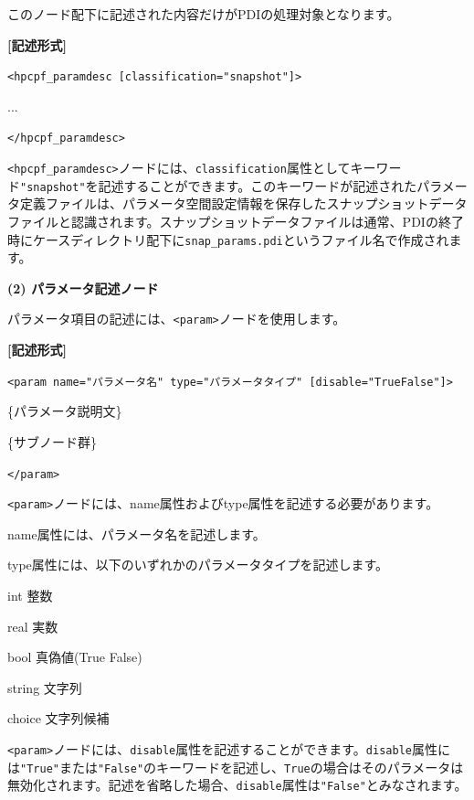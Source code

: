 \documentclass[a4paper,11pt]{jarticle}
\begin{document}
{このノード配下に記述された内容だけがPDIの処理対象となります。

\vspace{8pt}
\leftskip=12pt
\textbf{[記述形式]}

\leftskip=42pt
\texttt{<hpcpf\_paramdesc  [classification="snapshot"]>} 
   
...

\texttt{</hpcpf\_paramdesc>}

\vspace{8pt}
\leftskip=0pt
\texttt{<hpcpf\_paramdesc>}ノードには、{\tt classification}属性としてキーワード\texttt{"snapshot"}を記述することができます。このキーワードが記述されたパラメータ定義ファイルは、パラメータ空間設定情報を保存したスナップショットデータファイルと認識されます。スナップショットデータファイルは通常、PDIの終了時にケースディレクトリ配下に{\tt snap\_params.pdi}というファイル名で作成されます。

\vspace{12pt}
\textbf{(2) パラメータ記述ノード}

パラメータ項目の記述には、\texttt{<param>}ノードを使用します。

\vspace{8pt}
\leftskip=12pt
\textbf{[記述形式]}

\leftskip=42pt
\texttt{<param name="パラメータ名"  type="パラメータタイプ" 
 [disable="True\textbar{}False"]>}    

\parindent=14pt
\{パラメータ説明文\}

\{サブノード群\}

\parindent=0pt
\texttt{</param>}

\vspace{8pt}
\leftskip=0pt
\texttt{<param>}ノードには、name属性およびtype属性を記述する必要があります。

name属性には、パラメータ名を記述します。

type属性には、以下のいずれかのパラメータタイプを記述します。

\parindent=18pt
int 整数

real 実数

bool 真偽値(True \textbar{} False)

string 文字列

choice 文字列候補

\parindent=0pt
\texttt{<param>}ノードには、{\tt disable}属性を記述することができます。{\tt disable}属性には\texttt{"True"}または\texttt{"False"}のキーワードを記述し、{\tt True}の場合はそのパラメータは無効化されます。記述を省略した場合、{\tt disable}属性は\texttt{"False"}とみなされます。

}
\end{document}
